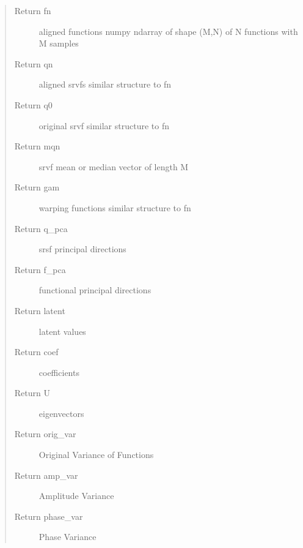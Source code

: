 \documentclass[letterpaper,10pt,english]{sphinxmanual}
\begin{document}
\begin{fulllineitems}
\begin{quote}
\begin{description}
\item[{Return fn}] \leavevmode
aligned functions \sphinxhyphen{} numpy ndarray of shape (M,N) of N
functions with M samples

\item[{Return qn}] \leavevmode
aligned srvfs \sphinxhyphen{} similar structure to fn

\item[{Return q0}] \leavevmode
original srvf \sphinxhyphen{} similar structure to fn

\item[{Return mqn}] \leavevmode
srvf mean or median \sphinxhyphen{} vector of length M

\item[{Return gam}] \leavevmode
warping functions \sphinxhyphen{} similar structure to fn

\item[{Return q\_pca}] \leavevmode
srsf principal directions

\item[{Return f\_pca}] \leavevmode
functional principal directions

\item[{Return latent}] \leavevmode
latent values

\item[{Return coef}] \leavevmode
coefficients

\item[{Return U}] \leavevmode
eigenvectors

\item[{Return orig\_var}] \leavevmode
Original Variance of Functions

\item[{Return amp\_var}] \leavevmode
Amplitude Variance

\item[{Return phase\_var}] \leavevmode
Phase Variance

\end{description}\end{quote}

\end{fulllineitems}

\end{document}

